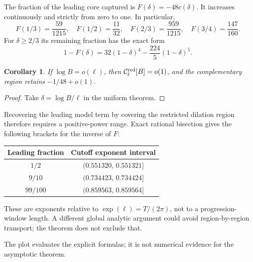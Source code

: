 \documentclass[11pt]{article}
\newtheorem{corollary}[theorem]{Corollary}
\newcommand{\Core}{\mathcal C}
\begin{document}
The fraction of the leading core captured is $F(\delta)=-48c(\delta)$.
It increases continuously and strictly from zero to one. In particular,
\[
 F(1/3)=\frac{59}{1215},\quad F(1/2)=\frac{11}{32},\quad
 F(2/3)=\frac{959}{1215},\quad F(3/4)=\frac{147}{160}.
\]
For $\delta\geq2/3$ its remaining fraction has the exact form
\begin{equation}\label{eq:tail}
 1-F(\delta)=32(1-\delta)^4-\frac{224}{5}(1-\delta)^5.
\end{equation}

\begin{corollary}
If $\log B=o(\ell)$, then $\Core_\ell^{\rm red}[B]=o(1)$, and
the complementary region retains $-1/48+o(1)$.
\end{corollary}
\begin{proof}
Take $\delta=\log B/\ell$ in the uniform theorem.
\end{proof}

Recovering the leading model term by covering the restricted dilation
region therefore requires a positive-power range. Exact rational
bisection gives the following brackets for the inverse of $F$:
\begin{center}
\begin{tabular}{cc}
\toprule
Leading fraction & Cutoff exponent interval\\
\midrule
$1/2$ & $(0.551320,\,0.551321]$\\
$9/10$ & $(0.734423,\,0.734424]$\\
$99/100$ & $(0.859563,\,0.859564]$\\
\bottomrule
\end{tabular}
\end{center}
These are exponents relative to $\exp(\ell)=T/(2\pi)$, not to a
progression-window length. A different global analytic argument could
avoid region-by-region transport; the theorem does not exclude that.

\begin{center}
\end{center}
The plot evaluates the explicit formulas; it is not numerical evidence
for the asymptotic theorem.
\end{document}
